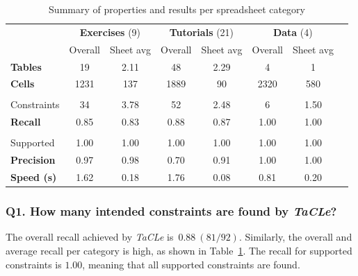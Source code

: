 \documentclass{IEEEtran}
\newcommand{\format}[1]{\textit{#1}\xspace}
\newcommand{\sname}{\format{TaCLe}}
\theoremstyle{definition}
\begin{document}
{\setlength{\tabcolsep}{0.33em}
\begin{table}[]
  \centering
  \caption{Summary of properties and results per spreadsheet category}
  \label{tbl:category_overview}
  \begin{tabularx}{\linewidth}{lccccccc}
 & \multicolumn{2}{c}{\textbf{Exercises} (9)} & \multicolumn{2}{c}{\textbf{Tutorials} (21)} & \multicolumn{2}{c}{\textbf{Data} (4)} \\
 & Overall & Sheet avg & Overall & Sheet avg & Overall & Sheet avg \\ \hline
    \textbf{Tables} & 19 & 2.11 & 48 & 2.29 & 4 & 1 \\ \hline
    \textbf{Cells} & 1231 & 137 & 1889 & 90 & 2320 & 580 \\ \hline
    \textbf{\begin{tabular}[c]{@{}l@{}}Intended\\[-4.5pt] Constraints\end{tabular}} & 34 & 3.78 & 52 & 2.48 & 6 & 1.50 \\ \hline \hline
\textbf{Recall} & 0.85 & 0.83 & 0.88 & 0.87 & 1.00 & 1.00 \\ \hline
\textbf{\begin{tabular}[c]{@{}l@{}}Recall\\[-4.5pt] Supported\end{tabular}} & 1.00 & 1.00 & 1.00 & 1.00 & 1.00 & 1.00 \\ \hline
\textbf{Precision} & 0.97 & 0.98 & 0.70 & 0.91 & 1.00 & 1.00 \\ \hline
\textbf{Speed (s)} & 1.62 & 0.18 & 1.76 & 0.08 & 0.81 & 0.20
\end{tabularx}
\end{table}}

\subsubsection*{Q1. How many intended constraints are found by \sname?}
The overall recall achieved by \sname is~$0.88~(81/92)$.
Similarly, the overall and average recall per category is high, as shown in Table~\ref{tbl:category_overview}.
The recall for supported constraints is $1.00$, meaning that all supported constraints are found.
\end{document}
